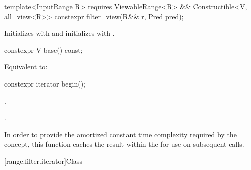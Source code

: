 %
\begin{itemdecl}
template<InputRange R>
  requires ViewableRange<R> && Constructible<V, all_view<R>>
constexpr filter_view(R&& r, Pred pred);
\end{itemdecl}

\begin{itemdescr}
\pnum
\effects Initializes  with 
and initializes  with .
\end{itemdescr}

%
\begin{itemdecl}
constexpr V base() const;
\end{itemdecl}

\begin{itemdescr}
\pnum
\effects Equivalent to: 
\end{itemdescr}

%
\begin{itemdecl}
constexpr iterator begin();
\end{itemdecl}

\begin{itemdescr}
\pnum
\expects
{}.

\pnum
\returns
{}.

\pnum
\remarks In order to provide the amortized constant time complexity required by
the  concept, this function caches the result within the
 for use on subsequent calls.
\end{itemdescr}

[range.filter.iterator]{Class }

